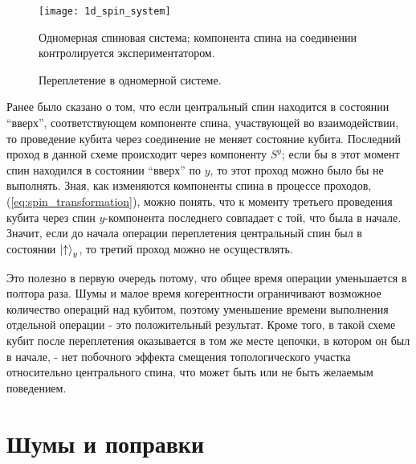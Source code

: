 \documentclass[a4paper,12pt]{article}
\theoremstyle{plain} %
\theoremstyle{definition} %
\theoremstyle{remark} %
\begin{document}
\begin{figure}
    \centering
    \texttt{[image: 1d\_spin\_system]}
    \caption{Одномерная спиновая система; компонента спина на соединении контролируется экспериментатором.}
    \label{fig:1d_spin_system}
\end{figure}

\begin{figure}
    \centering
    \captionsetup[subfigure]{justification=centering}
    \caption{Переплетение в одномерной системе.}
    \label{fig:1d_braiding}
\end{figure}

Ранее было сказано о том, что если центральный спин находится в состоянии ``вверх'', соответствующем компоненте спина, участвующей во взаимодействии, то проведение кубита через соединение не меняет состояние кубита. Последний проход в данной схеме происходит через компоненту $S^y$; если бы в этот момент спин находился в состоянии ``вверх'' по $y$, то этот проход можно было бы не выполнять. Зная, как изменяются компоненты спина в процессе проходов, (\ref{eq:spin_transformation}), можно понять, что к моменту третьего проведения кубита через спин $y$-компонента последнего совпадает с той, что была в начале. Значит, если до начала операции переплетения центральный спин был в состоянии $\ket{\uparrow}_y$, то третий проход можно не осуществлять.

Это полезно в первую очередь потому, что общее время операции уменьшается в полтора раза. Шумы и малое время когерентности ограничивают возможное количество операций над кубитом, поэтому уменьшение времени выполнения отдельной операции - это положительный результат. Кроме того, в такой схеме кубит после переплетения оказывается в том же месте цепочки, в котором он был в начале, - нет побочного эффекта смещения топологического участка относительно центрального спина, что может быть или не быть желаемым поведением.

\pagebreak

\section{Шумы и поправки} \label{sec:results}
\end{document}

